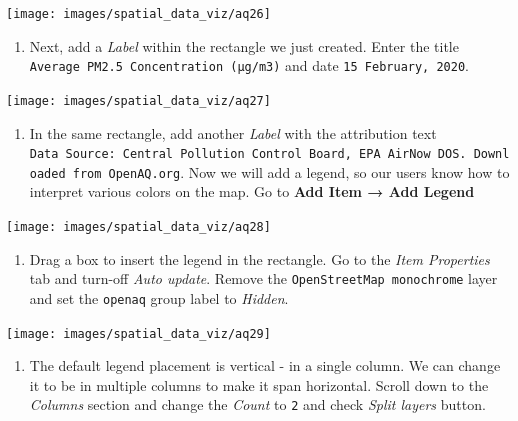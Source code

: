 \documentclass[
  12pt,
  a4paper]{article}
\providecommand{\tightlist}{%
  \setlength{\itemsep}{0pt}\setlength{\parskip}{0pt}}
\begin{document}
\begin{center}\texttt{[image: images/spatial\_data\_viz/aq26]} \end{center}

\begin{enumerate}
\def\labelenumi{\arabic{enumi}.}
\setcounter{enumi}{26}
\tightlist
\item
  Next, add a \emph{Label} within the rectangle we just created. Enter
  the title \texttt{Average\ PM2.5\ Concentration\ (µg/m3)} and date
  \texttt{15\ February,\ 2020}.
\end{enumerate}

\begin{center}\texttt{[image: images/spatial\_data\_viz/aq27]} \end{center}

\begin{enumerate}
\def\labelenumi{\arabic{enumi}.}
\setcounter{enumi}{27}
\tightlist
\item
  In the same rectangle, add another \emph{Label} with the attribution
  text
  \texttt{Data\ Source:\ Central\ Pollution\ Control\ Board,\ EPA\ AirNow\ DOS.\ Downloaded\ from\ OpenAQ.org}.
  Now we will add a legend, so our users know how to interpret various
  colors on the map. Go to \textbf{Add Item → Add Legend}
\end{enumerate}

\begin{center}\texttt{[image: images/spatial\_data\_viz/aq28]} \end{center}

\begin{enumerate}
\def\labelenumi{\arabic{enumi}.}
\setcounter{enumi}{28}
\tightlist
\item
  Drag a box to insert the legend in the rectangle. Go to the \emph{Item
  Properties} tab and turn-off \emph{Auto update}. Remove the
  \texttt{OpenStreetMap\ monochrome} layer and set the \texttt{openaq}
  group label to \emph{Hidden}.
\end{enumerate}

\begin{center}\texttt{[image: images/spatial\_data\_viz/aq29]} \end{center}

\begin{enumerate}
\def\labelenumi{\arabic{enumi}.}
\setcounter{enumi}{29}
\tightlist
\item
  The default legend placement is vertical - in a single column. We can
  change it to be in multiple columns to make it span horizontal. Scroll
  down to the \emph{Columns} section and change the \emph{Count} to
  \texttt{2} and check \emph{Split layers} button.
\end{enumerate}
\end{document}
